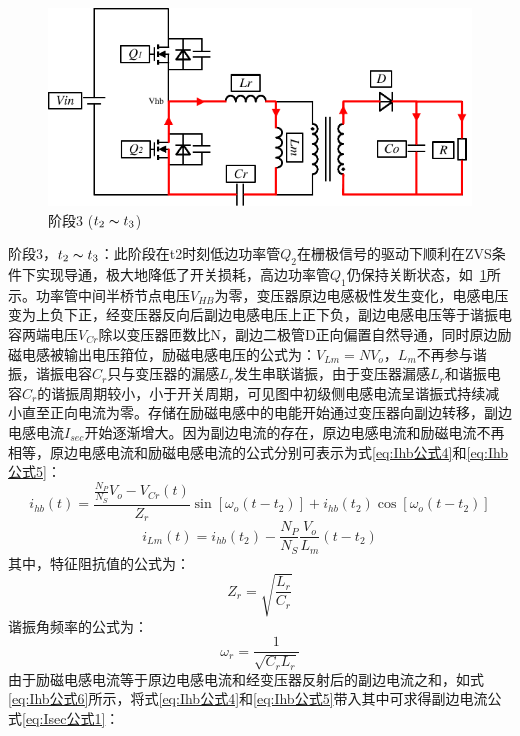                 
\begin{figure}[htbp] 
    \centering
    \includegraphics[width=0.8\linewidth]{figures/工作原理3.pdf}
    \caption{阶段3 ($t_2 \thicksim t_3$)}
    \label{fig:工作原理3}
\end{figure}

阶段3，$t_2 \thicksim t_3$：此阶段在t2时刻低边功率管$Q_2$在栅极信号的驱动下顺利在ZVS条件下实现导通，极大地降低了开关损耗，高边功率管$Q_1$仍保持关断状态，如~\ref{fig:工作原理3}所示。功率管中间半桥节点电压$V_{HB}$为零，变压器原边电感极性发生变化，电感电压变为上负下正，经变压器反向后副边电感电压上正下负，副边电感电压等于谐振电容两端电压$V_{Cr}$除以变压器匝数比N，副边二极管D正向偏置自然导通，同时原边励磁电感被输出电压箝位，励磁电感电压的公式为：$V_{Lm}=NV_o$，$L_m$不再参与谐振，谐振电容$C_r$只与变压器的漏感$L_r$发生串联谐振，由于变压器漏感$L_r$和谐振电容$C_r$的谐振周期较小，小于开关周期，可见图中初级侧电感电流呈谐振式持续减小直至正向电流为零。存储在励磁电感中的电能开始通过变压器向副边转移，副边电感电流$I_{sec}$开始逐渐增大。因为副边电流的存在，原边电感电流和励磁电流不再相等，原边电感电流和励磁电感电流的公式分别可表示为式\eqref{eq:Ihb公式4}和\eqref{eq:Ihb公式5}：
\begin{equation}
    \label{eq:Ihb公式4}
    i_{hb}(t) = \frac{\frac{N_P}{N_S}V_o - V_{Cr}(t)}{Z_r}\sin[\omega_o(t-t_2)] + i_{hb}(t_2) \cos[\omega_o(t-t_2)]  
\end{equation}
\begin{equation}
    \label{eq:Ihb公式5}
    i_{Lm}(t) = i_{hb}(t_2) - \frac{N_P}{N_S} \frac{V_o}{L_m}(t-t_2)
\end{equation}
其中，特征阻抗值的公式为：
\begin{equation}
    \label{eq:Zr公式}
    Z_r=\sqrt{\frac{L_r}{C_r}}  
\end{equation}
谐振角频率的公式为：
\begin{equation}
    \label{eq:omega_r公式}
    \omega_r=\frac{1}{\sqrt{C_r L_r}}
\end{equation}
由于励磁电感电流等于原边电感电流和经变压器反射后的副边电流之和，如式\eqref{eq:Ihb公式6}所示，将式\eqref{eq:Ihb公式4}和\eqref{eq:Ihb公式5}带入其中可求得副边电流公式\eqref{eq:Isec公式1}：
